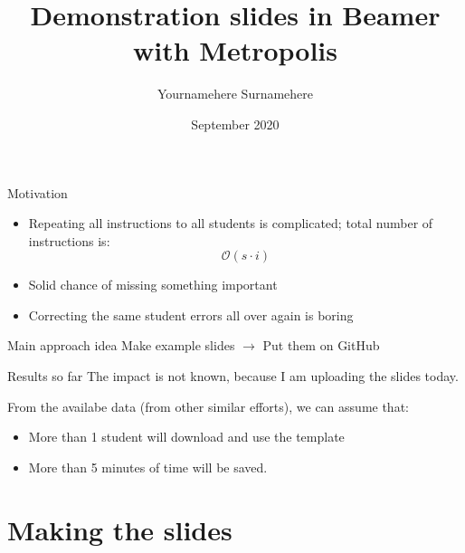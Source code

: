 \documentclass[aspectratio=169]{beamer}
\author{Yournamehere Surnamehere}
\title{Demonstration slides in Beamer with Metropolis} %
\date{September 2020} %
\begin{document}
\maketitle

%
%

\begin{frame}{Motivation}
\begin{itemize}
\item Repeating all instructions to all students is complicated; total number of instructions is:
$$\mathcal{O}(s\cdot i)$$
\pause %
\item Solid chance of missing something important
\item Correcting the same student errors all over again is boring
\end{itemize}
\end{frame}

\begin{frame}[standout]{Main approach idea}
Make example slides
$\to$
Put them on GitHub
\end{frame}

\begin{frame}{Results so far}
The impact is not known, because I am uploading the slides today.

\pause
From the availabe data (from other similar efforts), we can assume that:
\begin{itemize}
\item \alert<2>{More than 1 student will download and use the template}
\item \alert<3>{More than 5 minutes of time will be saved.} 
\end{itemize}
\end{frame}

\section{Making the slides}
\end{document}
